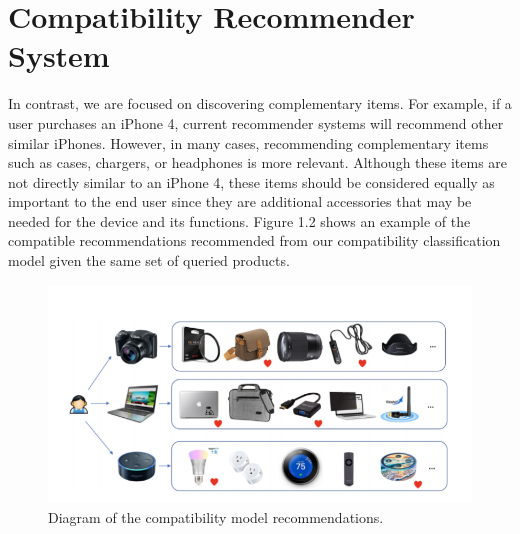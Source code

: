 \section{Compatibility Recommender System}
In contrast, we are focused on discovering complementary items. For example, if a user purchases an iPhone 4, current recommender systems will recommend other similar iPhones. However, in many cases, recommending complementary items such as cases, chargers, or headphones is more relevant. Although these items are not directly similar to an iPhone 4, these items should be considered equally as important to the end user since they are additional accessories that may be needed for the device and its functions. Figure 1.2 shows an example of the compatible recommendations recommended from our compatibility classification model given the same set of queried products. 

\begin{figure}[h!]
\centering
\includegraphics[scale=0.5]{data/CompatibilityModel.png}
\caption{Diagram of the compatibility model recommendations.}
\end{figure}


